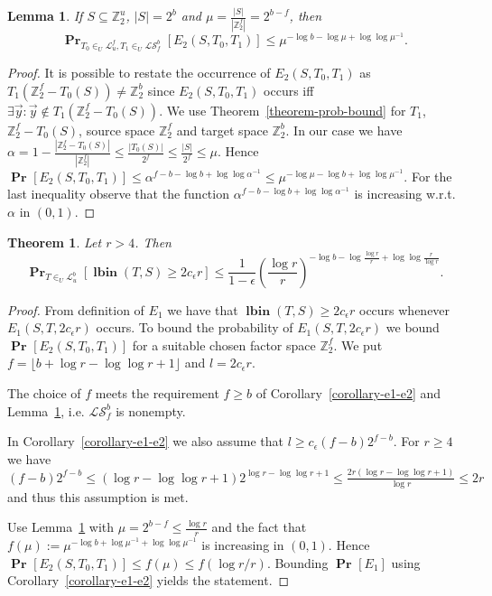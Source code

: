 \documentclass{article}
\newcommand{\lbin}[2]{\operatorname{\mathbf{lbin}}({#1}, {#2})}
\newcommand{\vecspace}[2]{\mathbb{Z}_{#1}^{#2}}
\newcommand{\binvecspace}[1]{\vecspace{2}{#1}}
\newcommand{\linearmaps}[2]{\mathcal{L}_{#1}^{#2}}
\newcommand{\surjectivelinearmaps}[2]{\mathcal{LS}_{#1}^{#2}}
\newcommand{\probs}[2]{\operatorname{\mathbf{Pr}}_{{#1}}\left[{#2}\right]}
\newcommand{\prob}[1]{\probs{}{#1}}
\newtheorem{lemma}{Lemma}
\newtheorem{theorem}{Theorem}
\begin{document}
\begin{lemma}
\label{lemma-bound}
If $S \subseteq \binvecspace{u}$, $|S| = 2^b$ and $\mu = \frac{|S|}{|\binvecspace{f}|} = 2^{b - f}$, then
\[
\probs{T_0 \in_U \linearmaps{u}{f}, T_1 \in_U \surjectivelinearmaps{f}{b}}{E_2(S, T_0, T_1)} \leq \mu ^ {-\log b - \log \mu + \log \log \mu^{-1}}.
\]
\end{lemma}
\begin{proof}
It is possible to restate the occurrence of $E_2(S, T_0, T_1)$ as $T_1(\binvecspace{f} - T_0(S)) \neq \binvecspace{b}$ since $E_2(S, T_0, T_1)$ occurs iff $\exists \vec{y} \colon \vec{y} \not\in T_1(\binvecspace{f} - T_0(S))$.
We use Theorem~\ref{theorem-prob-bound} for $T_1$, $\binvecspace{f} - T_0(S)$, source space $\binvecspace{f}$ and target space $\binvecspace{b}$.
In our case we have $\alpha = 1 - \frac{|\binvecspace{f} - T_0(S)|}{|\binvecspace{f}|} \leq \frac{|T_0(S)|}{2^f} \leq \frac{|S|}{2^f} \leq \mu$.
Hence
$
\prob{E_2(S, T_0, T_1)} \leq \alpha ^ {f - b - \log b + \log \log \alpha^{-1}} \leq \mu ^ {-\log \mu - \log b + \log \log \mu^{-1}}.
$
For the last inequality observe that the function $\alpha ^ {f - b - \log b + \log \log \alpha^{-1}}$ is increasing w.r.t. $\alpha$ in $(0, 1)$.
\end{proof} 

\begin{theorem}
\label{theorem-prob-distribution-bound}
Let $r > 4$. Then
\[
\probs{T \in_U \linearmaps{u}{b}}{\lbin{T}{S} \geq 2 c_\epsilon r} \leq \frac{1}{1 - \epsilon}\left(\frac{\log r}{r}\right)^{-\log b - \log \frac{\log r}{r} + \log \log \frac{r}{\log r}}.
\]
\end{theorem}
\begin{proof}
From definition of $E_1$ we have that $\lbin{T}{S} \geq 2 c_\epsilon r$ occurs whenever $E_1(S, T, 2 c_\epsilon r)$ occurs.
To bound the probability of $E_1(S, T, 2 c_\epsilon r)$ we bound $\prob{E_2(S, T_0, T_1)}$ for a suitable chosen factor space $\binvecspace{f}$.
We put $f = \lfloor b + \log r - \log \log r + 1 \rfloor$ and $l = 2c_\epsilon r$.

The choice of $f$ meets the requirement $f \geq b$ of Corollary~\ref{corollary-e1-e2} and Lemma~\ref{lemma-bound}, i.e. $\surjectivelinearmaps{f}{b}$ is nonempty.

In Corollary~\ref{corollary-e1-e2} we also assume that $l \geq c_\epsilon (f - b)2^{f - b}$.
For $r \geq 4$ we have $(f - b)2^{f - b} \leq (\log r - \log \log r + 1)2^{\log r - \log \log r + 1} \leq \frac{2r(\log r - \log \log r + 1)}{\log r} \leq 2r$ and thus this assumption is met.

Use Lemma~\ref{lemma-bound} with $\mu = 2^{b - f} \leq \frac{\log r}{r}$ and the fact that $f(\mu) := \mu ^ {- \log b + \log \mu^{-1} + \log \log \mu^{-1}}$ is increasing in $(0, 1)$.
Hence $\prob{E_2(S, T_0, T_1)} \leq f(\mu) \leq f(\log r/r)$.
Bounding $\prob{E_1}$ using Corollary~\ref{corollary-e1-e2} yields the statement.
\end{proof}
\end{document}
